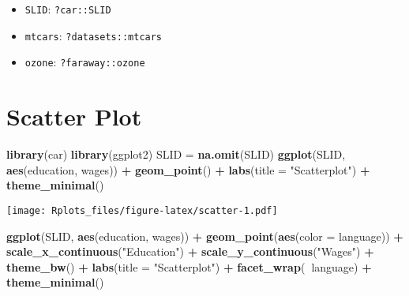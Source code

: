 \documentclass[]{article}
\newenvironment{Shaded}{\begin{snugshade}}{\end{snugshade}}
\newcommand{\KeywordTok}[1]{\textcolor[rgb]{0.13,0.29,0.53}{\textbf{#1}}}
\newcommand{\DataTypeTok}[1]{\textcolor[rgb]{0.13,0.29,0.53}{#1}}
\newcommand{\StringTok}[1]{\textcolor[rgb]{0.31,0.60,0.02}{#1}}
\newcommand{\OperatorTok}[1]{\textcolor[rgb]{0.81,0.36,0.00}{\textbf{#1}}}
\newcommand{\NormalTok}[1]{#1}
\providecommand{\tightlist}{%
  \setlength{\itemsep}{0pt}\setlength{\parskip}{0pt}}
\begin{document}
\begin{itemize}
\tightlist
\item
  \texttt{SLID}: \texttt{?car::SLID}
\item
  \texttt{mtcars}: \texttt{?datasets::mtcars}
\item
  \texttt{ozone}: \texttt{?faraway::ozone}
\end{itemize}

\section{Scatter Plot}\label{scatter-plot}

\begin{Shaded}
\begin{Highlighting}[]
\KeywordTok{library}\NormalTok{(car)}
\KeywordTok{library}\NormalTok{(ggplot2)}
\NormalTok{SLID =}\StringTok{ }\KeywordTok{na.omit}\NormalTok{(SLID)}
\KeywordTok{ggplot}\NormalTok{(SLID, }\KeywordTok{aes}\NormalTok{(education, wages)) }\OperatorTok{+}\StringTok{ }\KeywordTok{geom_point}\NormalTok{() }\OperatorTok{+}\StringTok{ }\KeywordTok{labs}\NormalTok{(}\DataTypeTok{title =} \StringTok{"Scatterplot"}\NormalTok{) }\OperatorTok{+}\StringTok{ }
\StringTok{    }\KeywordTok{theme_minimal}\NormalTok{()}
\end{Highlighting}
\end{Shaded}

\texttt{[image: Rplots\_files/figure-latex/scatter-1.pdf]}

\begin{Shaded}
\begin{Highlighting}[]
\KeywordTok{ggplot}\NormalTok{(SLID, }\KeywordTok{aes}\NormalTok{(education, wages)) }\OperatorTok{+}\StringTok{ }\KeywordTok{geom_point}\NormalTok{(}\KeywordTok{aes}\NormalTok{(}\DataTypeTok{color =}\NormalTok{ language)) }\OperatorTok{+}\StringTok{ }\KeywordTok{scale_x_continuous}\NormalTok{(}\StringTok{"Education"}\NormalTok{) }\OperatorTok{+}\StringTok{ }
\StringTok{    }\KeywordTok{scale_y_continuous}\NormalTok{(}\StringTok{"Wages"}\NormalTok{) }\OperatorTok{+}\StringTok{ }\KeywordTok{theme_bw}\NormalTok{() }\OperatorTok{+}\StringTok{ }\KeywordTok{labs}\NormalTok{(}\DataTypeTok{title =} \StringTok{"Scatterplot"}\NormalTok{) }\OperatorTok{+}\StringTok{ }
\StringTok{    }\KeywordTok{facet_wrap}\NormalTok{(}\OperatorTok{~}\NormalTok{language) }\OperatorTok{+}\StringTok{ }\KeywordTok{theme_minimal}\NormalTok{()}
\end{Highlighting}
\end{Shaded}
\end{document}
